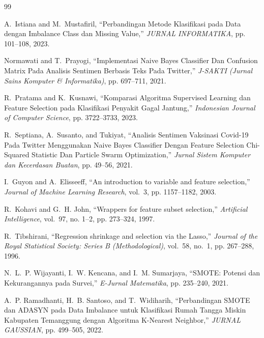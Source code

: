 \documentclass[a4paper,oneside,12pt]{report}
\begin{document}
\begin{thebibliography}{99}

A.~Istiana and M.~Mustafiril, ``Perbandingan Metode Klasifikasi pada Data dengan Imbalance Class dan Missing Value,'' \textit{JURNAL INFORMATIKA}, pp. 101--108, 2023.

Normawati and T.~Prayogi, ``Implementasi Naive Bayes Classifier Dan Confusion Matrix Pada Analisis Sentimen Berbasis Teks Pada Twitter,'' \textit{J-SAKTI (Jurnal Sains Komputer \& Informatika)}, pp. 697--711, 2021.

R.~Pratama and K.~Kusnawi, ``Komparasi Algoritma Supervised Learning dan Feature Selection pada Klasifikasi Penyakit Gagal Jantung,'' \textit{Indonesian Journal of Computer Science}, pp. 3722--3733, 2023.

R.~Septiana, A.~Susanto, and Tukiyat, ``Analisis Sentimen Vaksinasi Covid-19 Pada Twitter Menggunakan Naive Bayes Classifier Dengan Feature Selection Chi-Squared Statistic Dan Particle Swarm Optimization,'' \textit{Jurnal Sistem Komputer dan Kecerdasan Buatan}, pp. 49--56, 2021.

I.~Guyon and A.~Elisseeff, ``An introduction to variable and feature selection,'' \textit{Journal of Machine Learning Research}, vol.~3, pp. 1157--1182, 2003.

R.~Kohavi and G.~H. John, ``Wrappers for feature subset selection,'' \textit{Artificial Intelligence}, vol.~97, no. 1--2, pp. 273--324, 1997.

R.~Tibshirani, ``Regression shrinkage and selection via the Lasso,'' \textit{Journal of the Royal Statistical Society: Series B (Methodological)}, vol.~58, no.~1, pp. 267--288, 1996.

N.~L.~P. Wijayanti, I.~W. Kencana, and I.~M. Sumarjaya, ``SMOTE: Potensi dan Kekurangannya pada Survei,'' \textit{E-Jurnal Matematika}, pp. 235--240, 2021.

A.~P. Ramadhanti, H.~B. Santoso, and T.~Widiharih, ``Perbandingan SMOTE dan ADASYN pada Data Imbalance untuk Klasifikasi Rumah Tangga Miskin Kabupaten Temanggung dengan Algoritma K-Nearest Neighbor,'' \textit{JURNAL GAUSSIAN}, pp. 499--505, 2022.

\end{thebibliography}
\end{document}
